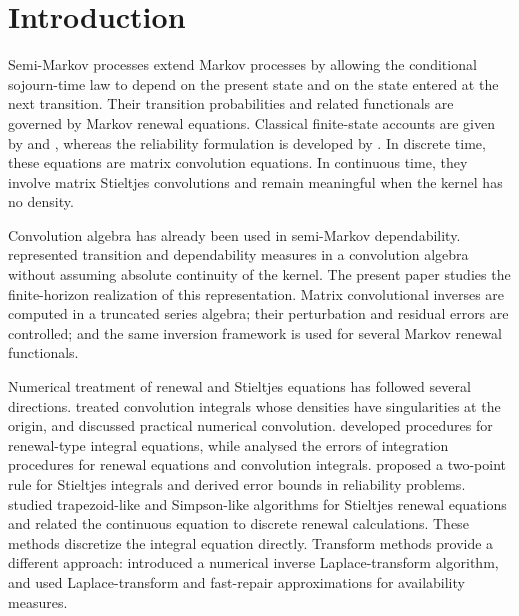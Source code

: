 \documentclass[3p,12pt,authoryear]{elsarticle}
\theoremstyle{definition}
\theoremstyle{remark}
\begin{document}
\section{Introduction}

Semi-Markov processes extend Markov processes by allowing the conditional sojourn-time law to depend on the present state and on the state entered at the next transition. Their transition probabilities and related functionals are governed by Markov renewal equations. Classical finite-state accounts are given by \citet{Pyke1961} and \citet{Cinlar1975}, whereas the reliability formulation is developed by \citet{LimniosOprisan2001}. In discrete time, these equations are matrix convolution equations. In continuous time, they involve matrix Stieltjes convolutions and remain meaningful when the kernel has no density.

Convolution algebra has already been used in semi-Markov dependability. \citet{Limnios1997} represented transition and dependability measures in a convolution algebra without assuming absolute continuity of the kernel. The present paper studies the finite-horizon realization of this representation. Matrix convolutional inverses are computed in a truncated series algebra; their perturbation and residual errors are controlled; and the same inversion framework is used for several Markov renewal functionals.

Numerical treatment of renewal and Stieltjes equations has followed several directions. \citet{McConalogue1981} treated convolution integrals whose densities have singularities at the origin, and \citet{Baxter1981} discussed practical numerical convolution. \citet{Xie1989} developed procedures for renewal-type integral equations, while \citet{XiePreussCui2003} analysed the errors of integration procedures for renewal equations and convolution integrals. \citet{BoehmePreussWall1991} proposed a two-point rule for Stieltjes integrals and derived error bounds in reliability problems. \citet{Tortorella2005} studied trapezoid-like and Simpson-like algorithms for Stieltjes renewal equations and related the continuous equation to discrete renewal calculations. These methods discretize the integral equation directly. Transform methods provide a different approach: \citet{Stehfest1970} introduced a numerical inverse Laplace-transform algorithm, and \citet{FinkelsteinZarudnij2002} used Laplace-transform and fast-repair approximations for availability measures.
\end{document}
